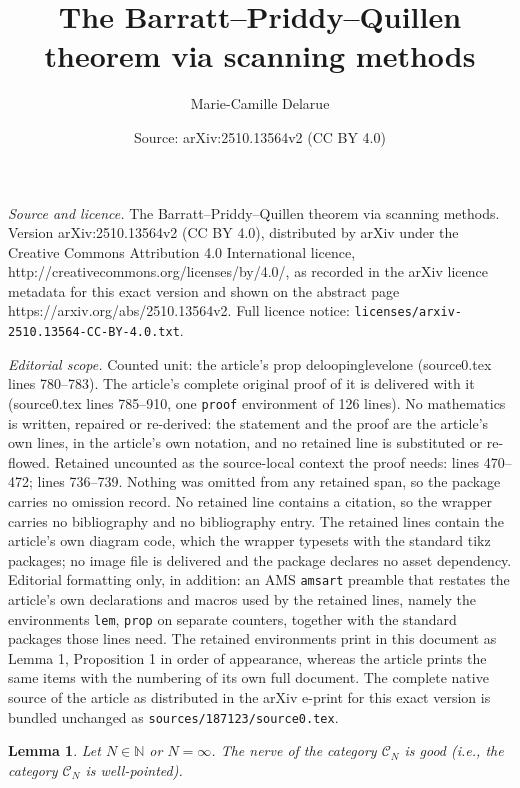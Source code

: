 \documentclass[10pt,a4paper]{amsart}
\title{The Barratt--Priddy--Quillen theorem via scanning methods}
\author{Marie-Camille Delarue}
\date{Source: arXiv:2510.13564v2 (CC BY 4.0)}
\newtheorem{lem}{Lemma}
\newcommand{\C}{\mathcal{C}}
\begin{document}
\maketitle

\noindent\emph{Source and licence.} The Barratt--Priddy--Quillen theorem via scanning methods. Version arXiv:2510.13564v2 (CC BY 4.0), distributed by arXiv under the Creative Commons Attribution 4.0 International licence, http://creativecommons.org/licenses/by/4.0/, as recorded in the arXiv licence metadata for this exact version and shown on the abstract page https://arxiv.org/abs/2510.13564v2. Full licence notice: \texttt{licenses/arxiv-2510.13564-CC-BY-4.0.txt}.\par\smallskip

\noindent\textit{Editorial scope.} Counted unit: the article's prop deloopinglevelone (source0.tex lines 780--783). The article's complete original proof of it is delivered with it (source0.tex lines 785--910, one \texttt{proof} environment of 126 lines). No mathematics is written, repaired or re-derived: the statement and the proof are the article's own lines, in the article's own notation, and no retained line is substituted or re-flowed.  Retained uncounted as the source-local context the proof needs: lines 470--472; lines 736--739.  Nothing was omitted from any retained span, so the package carries no omission record.  No retained line contains a citation, so the wrapper carries no bibliography and no bibliography entry.  The retained lines contain the article's own diagram code, which the wrapper typesets with the standard tikz packages; no image file is delivered and the package declares no asset dependency.  Editorial formatting only, in addition: an AMS \texttt{amsart} preamble that restates the article's own declarations and macros used by the retained lines, namely the environments \texttt{lem}, \texttt{prop} on separate counters, together with the standard packages those lines need.  The retained environments print in this document as Lemma 1, Proposition 1 in order of appearance, whereas the article prints the same items with the numbering of its own full document.  The complete native source of the article as distributed in the arXiv e-print for this exact version is bundled unchanged as \texttt{sources/187123/source0.tex}.
\begin{lem}\label{goodnerve}
Let $N\in\mathbb{N}$ or $N=\infty$. The nerve of the category $\C_N$ is good (i.e., the category $\C_N$ is well-pointed).
\end{lem}
\end{document}
